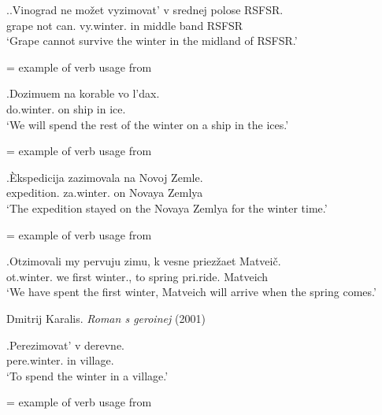 \ex.\label{ex:zimovat'}\ag.\label{ex:vyzimovat'}Vinograd ne mo\v{z}et vyzimovat' v srednej polose RSFSR.\\
grape not can. vy.winter. in middle band RSFSR\\
\vspace{0.5em}
`Grape cannot survive the winter in the midland of RSFSR.'
\begin{flushright}
\vspace{-0.5em}
= example of verb usage from \citealt{Ushakov:50}
\end{flushright}
\bg.\label{ex:dozimovat'}Dozimuem na korable vo l'dax.\\
do.winter. on ship in ice.\\
\vspace{0.5em}
`We will spend the rest of the winter on a ship in the ices.' 
\begin{flushright}
\vspace{-0.5em}
= example of verb usage from \citealt{Ushakov:50}
\end{flushright}
\bg.\label{ex:zazimovat'}\`{E}kspedicija zazimovala na Novoj Zemle.\\
expedition. za.winter. on Novaya Zemlya\\
\vspace{0.5em}
`The expedition stayed on the Novaya Zemlya for the winter time.'
\begin{flushright}
\vspace{-0.5em}
= example of verb usage from \citealt{Ushakov:50}
\end{flushright}
\bg.\label{ex:otzimovat'}Otzimovali my pervuju zimu, k vesne priez\v{z}aet Matvei\v{c}.\\
ot.winter. we first winter., to spring pri.ride. Matveich\\
\vspace{0.5em}
`We have spent the first winter, Matveich will arrive when the spring comes.'
\begin{flushright}
\vspace{-0.5em}
Dmitrij Karalis. \textit{Roman s geroinej} (2001)
\end{flushright}
\bg.\label{ex:perezimovat'}Perezimovat' v derevne.\\
pere.winter. in village.\\
\vspace{0.5em}
`To spend the winter in a village.'
\begin{flushright}
\vspace{-0.5em}
= example of verb usage from \citealt{Ushakov:50}
\end{flushright}
